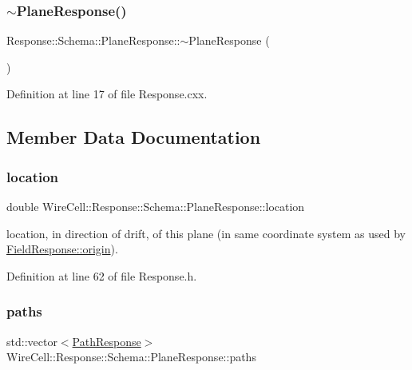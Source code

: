\subsubsection{\texorpdfstring{$\sim$\+Plane\+Response()}{~PlaneResponse()}}
{\footnotesize\ttfamily Response\+::\+Schema\+::\+Plane\+Response\+::$\sim$\+Plane\+Response (\begin{DoxyParamCaption}{ }\end{DoxyParamCaption})}



Definition at line 17 of file Response.\+cxx.



\subsection{Member Data Documentation}
\mbox{\label{struct_wire_cell_1_1_response_1_1_schema_1_1_plane_response_aacc9dfe4e52b217a966dba448a34cf88}} 
\subsubsection{\texorpdfstring{location}{location}}
{\footnotesize\ttfamily double Wire\+Cell\+::\+Response\+::\+Schema\+::\+Plane\+Response\+::location}

location, in direction of drift, of this plane (in same coordinate system as used by \hyperlink{struct_wire_cell_1_1_response_1_1_schema_1_1_field_response_aadaa425d6a5c65ed739a3f3b5f53cdbb}{Field\+Response\+::origin}). 

Definition at line 62 of file Response.\+h.

\mbox{\label{struct_wire_cell_1_1_response_1_1_schema_1_1_plane_response_a3c93c99a96e85b80eb298d12356d3e50}} 
\subsubsection{\texorpdfstring{paths}{paths}}
{\footnotesize\ttfamily std\+::vector$<$\hyperlink{struct_wire_cell_1_1_response_1_1_schema_1_1_path_response}{Path\+Response}$>$ Wire\+Cell\+::\+Response\+::\+Schema\+::\+Plane\+Response\+::paths}



